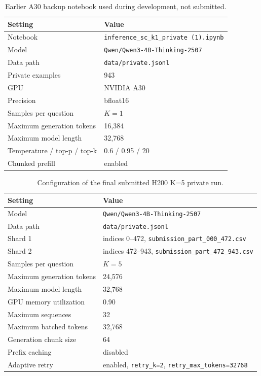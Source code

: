 \documentclass{article}
\begin{document}
\begin{table}[h]
\centering
\caption{Earlier A30 backup notebook used during development, not submitted.}
\label{tab:k1-config}
\begin{tabular}{ll}
\toprule
Setting & Value \\
\midrule
Notebook & \texttt{inference\_sc\_k1\_private (1).ipynb} \\
Model & \texttt{Qwen/Qwen3-4B-Thinking-2507} \\
Data path & \texttt{data/private.jsonl} \\
Private examples & 943 \\
GPU & NVIDIA A30 \\
Precision & bfloat16 \\
Samples per question & $K=1$ \\
Maximum generation tokens & 16,384 \\
Maximum model length & 32,768 \\
Temperature / top-p / top-k & 0.6 / 0.95 / 20 \\
Chunked prefill & enabled \\
\bottomrule
\end{tabular}
\end{table}

\begin{table}[h]
\centering
\caption{Configuration of the final submitted H200 K=5 private run.}
\label{tab:h200-config}
\begin{tabular}{ll}
\toprule
Setting & Value \\
\midrule
Model & \texttt{Qwen/Qwen3-4B-Thinking-2507} \\
Data path & \texttt{data/private.jsonl} \\
Shard 1 & indices 0--472, \texttt{submission\_part\_000\_472.csv} \\
Shard 2 & indices 472--943, \texttt{submission\_part\_472\_943.csv} \\
Samples per question & $K=5$ \\
Maximum generation tokens & 24,576 \\
Maximum model length & 32,768 \\
GPU memory utilization & 0.90 \\
Maximum sequences & 32 \\
Maximum batched tokens & 32,768 \\
Generation chunk size & 64 \\
Prefix caching & disabled \\
Adaptive retry & enabled, \texttt{retry\_k=2}, \texttt{retry\_max\_tokens=32768} \\
\bottomrule
\end{tabular}
\end{table}
\end{document}
